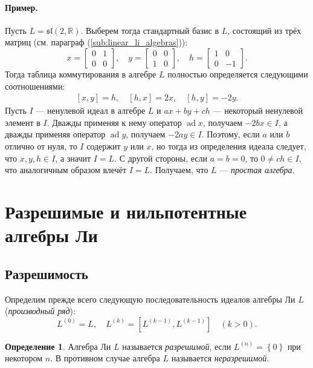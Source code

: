 \documentclass[a4paper, 12pt]{article}
\theoremstyle{definition}
\newtheorem{definition}{Определение}[section]
\begin{document}
\paragraph{Пример.}
Пусть \({ L = \mathfrak{sl}(2, \mathbb R) }\). Выберем тогда стандартный базис в \({ L }\), состоящий из трёх матриц (см. параграф (\ref{sub:linear_li_algebras})):
\[
    x = \begin{bmatrix}
        0 & 1 \\
        0 & 0
    \end{bmatrix}, \quad
    y = \begin{bmatrix}
        0 & 0 \\
        1 & 0
    \end{bmatrix}, \quad
    h = \begin{bmatrix}
        1 & 0 \\
        0 & -1
    \end{bmatrix}.
\]
Тогда таблица коммутирования в алгебре \({ L }\) полностью определяется следующими соотношениями:
\[
    \begin{gathered}
        [x, y] = h, \quad  [h, x] = 2x, \quad [h, y] = -2y.
    \end{gathered}
\]
Пусть \({ I }\) --- ненулевой идеал в алгебре \({ L }\) и \({ ax + by + ch }\) --- некоторый ненулевой элемент в \({ I }\). Дважды применяя к нему оператор \({ \operatorname{ad} x }\), получаем \({ -2b x \in I }\), а дважды применяя оператор \({ \operatorname{ad} y }\), получаем \({ -2ay \in I }\). Поэтому, если \({ a }\) или \({ b }\) отлично от нуля, то \({ I }\) содержит \({ y }\) или \({ x }\), но тогда из определения идеала следует, что \({ x, y, h \in I }\), а значит \({ I = L }\). С другой стороны, если \({ a = b = 0 }\), то \({ 0 \neq ch \in I }\), что аналогичным образом влечёт \({ I = L }\). Получаем, что \({ L }\) --- \textit{простая алгебра}.

\section{Разрешимые и нильпотентные алгебры Ли}
\subsection{Разрешимость}

Определим прежде всего следующую последовательность идеалов алгебры Ли \({ L }\) (\textit{производный ряд}):
\[
    L^{(0)} = L, \quad L^{(k)} = [L^{(k - 1)}, L^{(k - 1)}] \quad (k > 0).
\]

\begin{definition}
Алгебра Ли \({ L }\) называется \textit{разрешимой}, если \({ L^{(n)} = \left\{ 0 \right\} }\) при некотором \({ n }\). В противном случае алгебра \({ L }\) называется \textit{неразрешимой}.
\end{definition}
\end{document}
